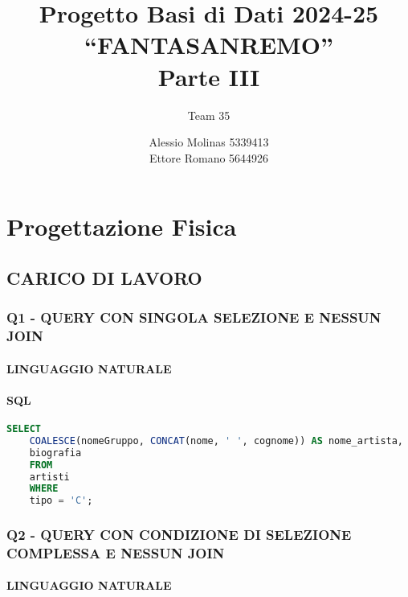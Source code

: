 \documentclass[a4paper]{article}
\title{Progetto Basi di Dati 2024-25 \\
“FANTASANREMO” \\
Parte III}
\author{Team 35
	\\
	\and Alessio Molinas 5339413\\Ettore Romano 5644926}
\date{}
\begin{document}
\maketitle


\section{Progettazione Fisica\\}

\subsection{CARICO DI LAVORO\\}

\subsubsection{Q1 - QUERY CON SINGOLA SELEZIONE E NESSUN JOIN\\}

\paragraph*{LINGUAGGIO NATURALE \\} 



\paragraph*{SQL \\}

\begin{lstlisting}[language=SQL]
	SELECT 
	COALESCE(nomeGruppo, CONCAT(nome, ' ', cognome)) AS nome_artista,
	biografia
	FROM 
	artisti
	WHERE 
	tipo = 'C';
\end{lstlisting}



\subsubsection{Q2 - QUERY CON CONDIZIONE DI SELEZIONE COMPLESSA E NESSUN JOIN\\}

\paragraph*{LINGUAGGIO NATURALE\\}
\end{document}
